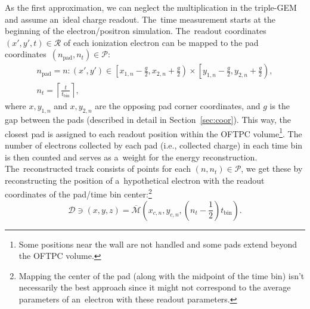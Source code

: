		As the first approximation, we can neglect the multiplication in the triple\nobreakdash-\ac{GEM} and assume an~ideal charge readout. The~time measurement starts at the beginning of the electron/positron simulation. The~readout coordinates ${(x',y',t)\in\mathcal{R}}$ of each ionization electron can be mapped to the pad coordinates~$(n_\text{pad},n_t) \in \mathcal{P}$:
			\begin{gather}
				n_\text{pad} = n\colon (x',y') \in \left[x_{1,n}-\frac{g}{2},x_{2,n}+\frac{g}{2}\right)\times\left[y_{1,n}-\frac{g}{2},y_{2,n}+\frac{g}{2}\right),\\
				n_t = \left\lceil \frac{t}{t_\text{bin}}\right\rceil,
			\end{gather}
		where $x,y_{1,n}$ and $x,y_{2,n}$ are the opposing pad corner coordinates, and $g$ is the gap between the pads (described in detail in Section~\ref{sec:coor}). This way, the closest pad is assigned to each readout position within the \ac{OFTPC} volume\footnote{Some positions near the wall are not handled and some pads extend beyond the \ac{OFTPC} volume.}. The number of electrons collected by each pad (i.e., collected charge) in each time bin is then counted and serves as a~weight for the energy reconstruction. The~reconstructed track consists of points for each $(n,n_t)\in\mathcal{P}$, we get these by reconstructing the position of a~hypothetical electron with the readout coordinates of the pad/time bin center:\footnote{Mapping the center of the pad (along with the midpoint of the time bin) isn't necessarily the best approach since it might not correspond to the average parameters of an~electron with these readout parameters.}
			\begin{equation}
				\mathcal{D} \ni (x,y,z) = \overline{\mathcal{M}}\left(x_{c,n},y_{c,n},\left(n_t-\frac{1}{2}\right)t_\text{bin}\right).
			\end{equation}